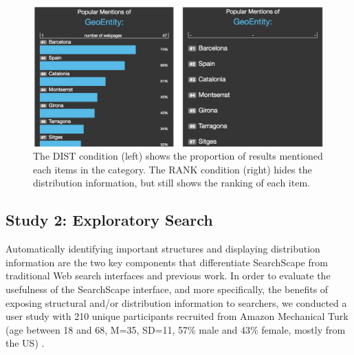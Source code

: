 

\begin{figure}
    \centering
    \includegraphics[width=0.6\columnwidth]{Chapters/SearchScape/figures/conds_short.png}
    \caption[A baseline system used in the SearchScape study.]{The DIST condition (left) shows the proportion of results mentioned each items in the category. The RANK condition (right) hides the distribution information, but still shows the ranking of each item.}
    \label{fig:conds}
\end{figure}



\subsection{Study 2: Exploratory Search}

Automatically identifying important structures and displaying distribution information are the two key components that differentiate SearchScape from traditional Web search interfaces and previous work. In order to evaluate the usefulness of the SearchScape interface, and more specifically, the benefits of exposing structural and/or distribution information to searchers, we conducted a user study with 210 unique participants recruited from Amazon Mechanical Turk (age between 18 and 68, M=35, SD=11, 57\% male and 43\% female, mostly from the US) \cite{kittur2008crowdsourcing}.

